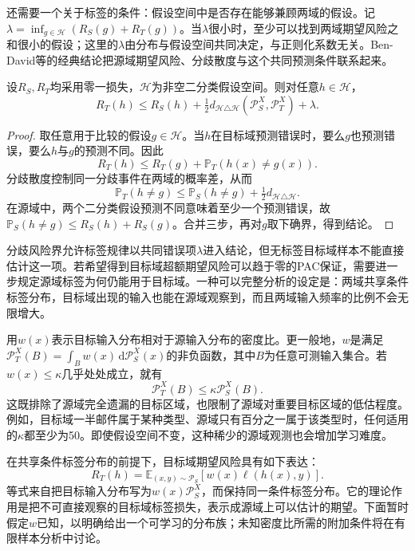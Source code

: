 还需要一个关于标签的条件：假设空间中是否存在能够兼顾两域的假设。记
$\lambda=\inf_{g\in\mathcal H}(R_S(g)+R_T(g))$。当$\lambda$很小时，至少可以找到两域期望风险之和很小的假设；这里的$\lambda$由分布与假设空间共同决定，与正则化系数无关。Ben-David等的经典结论把源域期望风险、分歧散度与这个共同预测条件联系起来。

\begin{theorem}[领域自适应的目标域期望风险界]
\label{thm:domain-adaptation-bound}
设$R_S,R_T$均采用零一损失，$\mathcal H$为非空二分类假设空间。则对任意$h\in\mathcal H$，
\begin{equation}
 R_T(h)\leq R_S(h)
 +\tfrac12d_{\mathcal H\triangle\mathcal H}(\mathcal P_S^X,\mathcal P_T^X)
 +\lambda.
 \label{eq:domain-adaptation-risk-bound}
\end{equation}
\end{theorem}
\begin{proof}
取任意用于比较的假设$g\in\mathcal H$。当$h$在目标域预测错误时，要么$g$也预测错误，要么$h$与$g$的预测不同。因此
\[
 R_T(h)\leq R_T(g)+\mathbb P_T(h(x)\neq g(x)).
\]
分歧散度控制同一分歧事件在两域的概率差，从而
\[
 \mathbb P_T(h\neq g)
 \leq\mathbb P_S(h\neq g)+\tfrac12d_{\mathcal H\triangle\mathcal H}.
\]
在源域中，两个二分类假设预测不同意味着至少一个预测错误，故
$\mathbb P_S(h\neq g)\leq R_S(h)+R_S(g)$。合并三步，再对$g$取下确界，得到结论。
\end{proof}

分歧风险界允许标签规律以共同错误项$\lambda$进入结论，但无标签目标域样本不能直接估计这一项。若希望得到目标域超额期望风险可以趋于零的PAC保证，需要进一步规定源域标签为何仍能用于目标域。一种可以完整分析的设定是：两域共享条件标签分布，目标域出现的输入也能在源域观察到，而且两域输入频率的比例不会无限增大。

用$w(x)$表示目标输入分布相对于源输入分布的密度比。更一般地，$w$是满足
$\mathcal P_T^X(B)=\int_B w(x)\,\mathrm d\mathcal P_S^X(x)$的非负函数，其中$B$为任意可测输入集合。若$w(x)\leq\kappa$几乎处处成立，就有
\[
 \mathcal P_T^X(B)\leq\kappa\mathcal P_S^X(B).
\]
这既排除了源域完全遗漏的目标区域，也限制了源域对重要目标区域的低估程度。例如，目标域一半邮件属于某种类型、源域只有百分之一属于该类型时，任何适用的$\kappa$都至少为50。即使假设空间不变，这种稀少的源域观测也会增加学习难度。

在共享条件标签分布的前提下，目标域期望风险具有如下表达：
\begin{equation}
 R_T(h)=\mathbb E_{(x,y)\sim\mathcal P_S}
                 [w(x)\ell(h(x),y)].
 \label{eq:covariate-risk-identity}
\end{equation}
等式来自把目标输入分布写为$w(x)\mathcal P_S^X$，而保持同一条件标签分布。它的理论作用是把不可直接观察的目标域标签损失，表示成源域上可以估计的期望。下面暂时假定$w$已知，以明确给出一个可学习的分布族；未知密度比所需的附加条件将在有限样本分析中讨论。

